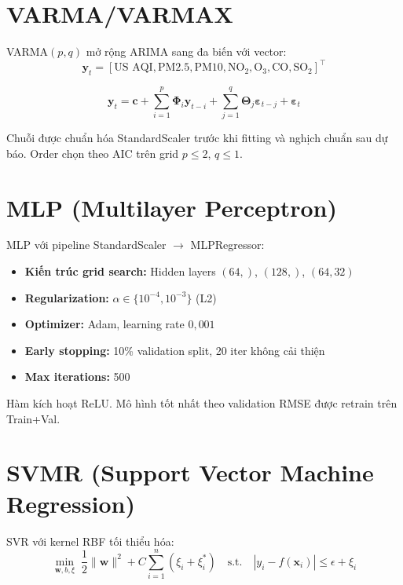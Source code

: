 \documentclass[12pt,a4paper]{report}
\begin{document}
\section{VARMA/VARMAX}

VARMA$(p, q)$ mở rộng ARIMA sang đa biến với vector:
\[
  \mathbf{y}_t = [\text{US AQI}, \text{PM2.5}, \text{PM10}, \text{NO}_2, \text{O}_3, \text{CO}, \text{SO}_2]^\top
\]

\begin{equation}
  \mathbf{y}_t = \mathbf{c} + \sum_{i=1}^{p}\mathbf{\Phi}_i \mathbf{y}_{t-i} + \sum_{j=1}^{q}\mathbf{\Theta}_j \boldsymbol{\varepsilon}_{t-j} + \boldsymbol{\varepsilon}_t
\end{equation}

Chuỗi được chuẩn hóa StandardScaler trước khi fitting và nghịch chuẩn sau dự báo. Order chọn theo AIC trên grid $p \leq 2$, $q \leq 1$.

\section{MLP (Multilayer Perceptron)}

MLP với pipeline StandardScaler $\to$ MLPRegressor:

\begin{itemize}
  \item \textbf{Kiến trúc grid search:} Hidden layers $(64,)$, $(128,)$, $(64, 32)$
  \item \textbf{Regularization:} $\alpha \in \{10^{-4}, 10^{-3}\}$ (L2)
  \item \textbf{Optimizer:} Adam, learning rate $0{,}001$
  \item \textbf{Early stopping:} 10\% validation split, 20 iter không cải thiện
  \item \textbf{Max iterations:} 500
\end{itemize}

Hàm kích hoạt ReLU. Mô hình tốt nhất theo validation RMSE được retrain trên Train+Val.

\section{SVMR (Support Vector Machine Regression)}

SVR với kernel RBF tối thiểu hóa:
\begin{equation}
  \min_{\mathbf{w}, b, \xi} \; \frac{1}{2}\|\mathbf{w}\|^2 + C\sum_{i=1}^n (\xi_i + \xi_i^*)
  \quad \text{s.t.} \quad |y_i - f(\mathbf{x}_i)| \leq \epsilon + \xi_i
\end{equation}
\end{document}
